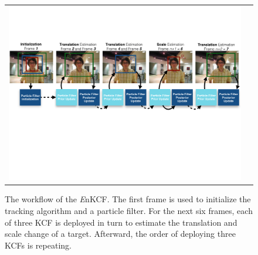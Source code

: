 \documentclass[10pt,twocolumn,letterpaper]{article}
\begin{document}
\begin{figure}[!h]
\centering
\begin{tabular}{cc}
\includegraphics[width=14.00cm]{./figures/Workflow_MKCF+PF.pdf}\\
\end{tabular}
\caption{The workflow of the {\it E}nKCF. The first frame is used to
  initialize the tracking algorithm and a particle filter. For the
  next six frames, each of three KCF is deployed in turn to estimate
  the translation and scale change of a target. Afterward, the order
  of deploying three KCFs is repeating.}
\label{Workflows}
\end{figure}
\end{document}

